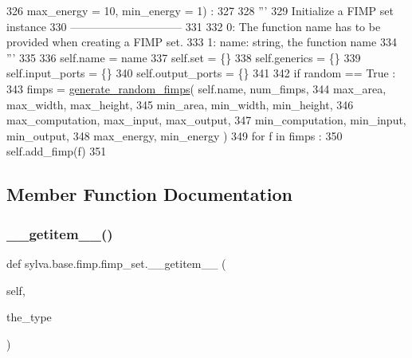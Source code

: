 \begin{DoxyCode}
326       max\_energy = 10, min\_energy = 1) :
327 
328       \textcolor{stringliteral}{'''}
329 \textcolor{stringliteral}{        Initialize a FIMP set instance}
330 \textcolor{stringliteral}{        ------------------------------}
331 \textcolor{stringliteral}{}
332 \textcolor{stringliteral}{        0: The function name has to be provided when creating a FIMP set.}
333 \textcolor{stringliteral}{        1: name: string, the function name}
334 \textcolor{stringliteral}{      '''}
335 
336       self.name = name
337       self.set = \{\}
338       self.generics = \{\}
339       self.input\_ports = \{\}
340       self.output\_ports = \{\}
341 
342       \textcolor{keywordflow}{if} random == \textcolor{keyword}{True} :
343         fimps = \hyperlink{namespacesylva_1_1base_1_1fimp_a437b2db1db9bdd48145289d66871b835}{generate\_random\_fimps}( self.name, num\_fimps,
344                                        max\_area, max\_width, max\_height,
345                                        min\_area, min\_width, min\_height,
346                                        max\_computation, max\_input, max\_output,
347                                        min\_computation,  min\_input,  min\_output,
348                                        max\_energy, min\_energy )
349         \textcolor{keywordflow}{for} f \textcolor{keywordflow}{in} fimps :
350           self.add\_fimp(f)
351 
\end{DoxyCode}


\subsection{Member Function Documentation}
\mbox{\label{classsylva_1_1base_1_1fimp_1_1fimp__set_ac60ac2361915c433b70be643b4406201}} 
\subsubsection{\texorpdfstring{\+\_\+\+\_\+getitem\+\_\+\+\_\+()}{\_\_getitem\_\_()}}
{\footnotesize\ttfamily def sylva.\+base.\+fimp.\+fimp\+\_\+set.\+\_\+\+\_\+getitem\+\_\+\+\_\+ (\begin{DoxyParamCaption}\item[{}]{self,  }\item[{}]{the\+\_\+type }\end{DoxyParamCaption})}

